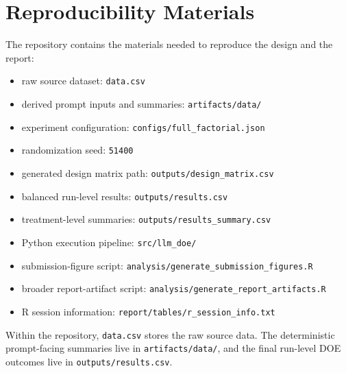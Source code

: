 \documentclass{article}
\begin{document}
\appendix
\section{Reproducibility Materials}

The repository contains the materials needed to reproduce the design and the report:
\begin{itemize}[leftmargin=1.7em]
    \item raw source dataset: \texttt{data.csv}
    \item derived prompt inputs and summaries: \texttt{artifacts/data/}
    \item experiment configuration: \texttt{configs/full\_factorial.json}
    \item randomization seed: \texttt{51400}
    \item generated design matrix path: \texttt{outputs/design\_matrix.csv}
    \item balanced run-level results: \texttt{outputs/results.csv}
    \item treatment-level summaries: \texttt{outputs/results\_summary.csv}
    \item Python execution pipeline: \texttt{src/llm\_doe/}
    \item submission-figure script: \texttt{analysis/generate\_submission\_figures.R}
    \item broader report-artifact script: \texttt{analysis/generate\_report\_artifacts.R}
    \item R session information: \texttt{report/tables/r\_session\_info.txt}
\end{itemize}

Within the repository, \texttt{data.csv} stores the raw source data. The deterministic prompt-facing summaries live in \texttt{artifacts/data/}, and the final run-level DOE outcomes live in \texttt{outputs/results.csv}.



\end{document}
